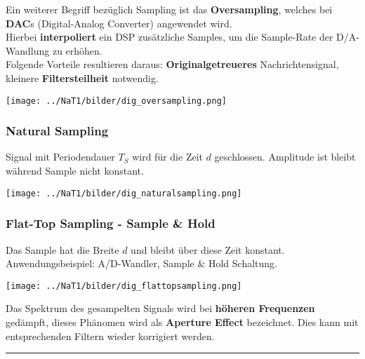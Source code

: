 Ein weiterer Begriff bezüglich Sampling ist das \textbf{Oversampling}, welches bei \textbf{DAC}s
(Digital-Analog Converter) angewendet wird. \\
Hierbei \textbf{interpoliert} ein DSP zusätzliche Samples, um die Sample-Rate der D/A-Wandlung zu
erhöhen.\\
Folgende Vorteile resultieren daraus: \textbf{Originalgetreueres} Nachrichtensignal, kleinere
\textbf{Filtersteilheit} notwendig.
	\begin{center}
		\texttt{[image: ../NaT1/bilder/dig\_oversampling.png]}
	\end{center}

\subsubsection{Natural Sampling}
Signal mit Periodendauer $T_S$ wird für die Zeit $d$ geschlossen. Amplitude ist bleibt
während Sample nicht konstant. \\

	\begin{center}
		\texttt{[image: ../NaT1/bilder/dig\_naturalsampling.png]}
	\end{center}

\subsubsection{Flat-Top Sampling - Sample \& Hold}
Das Sample hat die Breite $d$ und bleibt über diese Zeit konstant. \\
Anwendungsbeispiel: A/D-Wandler, Sample \& Hold Schaltung. \\
	\begin{center}
		\texttt{[image: ../NaT1/bilder/dig\_flattopsampling.png]}
	\end{center}
Das Spektrum des gesampelten Signals wird bei \textbf{höheren Frequenzen} gedämpft, dieses Phänomen
wird als \textbf{Aperture Effect} bezeichnet. Dies kann mit entsprechenden Filtern wieder
korrigiert werden.\\
\hrule
 
